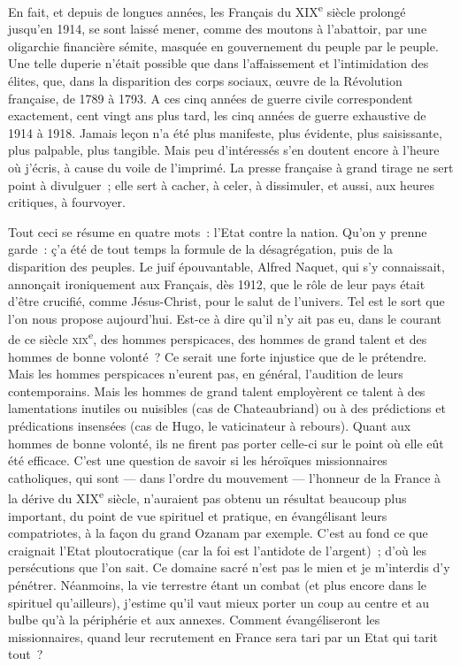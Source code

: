 \documentclass[french,twoside]{book} %
\begin{document}
En fait, et depuis de longues années, les Français du XIX\textsuperscript{e} siècle prolongé jusqu’en 1914, se sont laissé mener, comme des moutons à l’abattoir, par une oligarchie financière sémite, masquée en gouvernement du peuple par le peuple. Une telle duperie n’était possible que dans l’affaissement et l’intimidation des élites, que, dans la disparition des corps sociaux, œuvre de la Révolution française, de 1789 à 1793. A ces cinq années de guerre civile correspondent exactement, cent vingt ans plus tard, les cinq années de guerre exhaustive de 1914 à 1918. Jamais leçon n’a été plus manifeste, plus évidente, plus saisissante, plus palpable, plus tangible. Mais peu d’intéressés s’en doutent encore à l’heure où j’écris, à cause du voile de l’imprimé. La presse française à grand tirage ne sert point à divulguer ; elle sert à cacher, à celer, à dissimuler, et aussi, aux heures critiques, à fourvoyer.\par
Tout ceci se résume en quatre mots : l’Etat contre la nation. Qu’on y prenne garde : ç’a été de tout temps la formule de la désagrégation, puis de la disparition des peuples. Le juif épouvantable, Alfred Naquet, qui s’y connaissait, annonçait ironiquement aux Français, dès 1912, que le rôle de leur pays était d’être crucifié, comme Jésus-Christ, pour le salut de l’univers. Tel est le sort que l’on nous propose aujourd’hui. Est-ce à dire qu’il n’y ait pas eu, dans le courant de ce siècle \textsc{xix}\textsuperscript{e}, des hommes perspicaces, des hommes de grand talent et des hommes de bonne volonté ? Ce serait une forte injustice que de le prétendre. Mais les hommes perspicaces n’eurent pas, en général, l’audition de leurs contemporains. Mais les hommes de grand talent employèrent ce talent à des lamentations inutiles ou nuisibles (cas de Chateaubriand) ou à des prédictions et prédications insensées (cas de Hugo, le vaticinateur à rebours). Quant aux hommes de bonne volonté, ils ne firent pas porter celle-ci sur le point où elle eût été efficace. C’est une question de savoir si les héroïques missionnaires catholiques, qui sont — dans l’ordre du mouvement — l’honneur de la France à la dérive du XIX\textsuperscript{e} siècle, n’auraient pas obtenu un résultat beaucoup plus important, du point de vue spirituel et pratique, en évangélisant leurs compatriotes, à la façon du grand Ozanam par exemple. C’est au fond ce que craignait l’Etat ploutocratique (car la foi est l’antidote de l’argent) ; d’où les persécutions que l’on sait. Ce domaine sacré n’est pas le mien et je m’interdis d’y pénétrer. Néanmoins, la vie terrestre étant un combat (et plus encore dans le spirituel qu’ailleurs), j’estime qu’il vaut mieux porter un coup au centre et au bulbe qu’à la périphérie et aux annexes. Comment évangéliseront les missionnaires, quand leur recrutement en France sera tari par un Etat qui tarit tout ?\par
\end{document}
